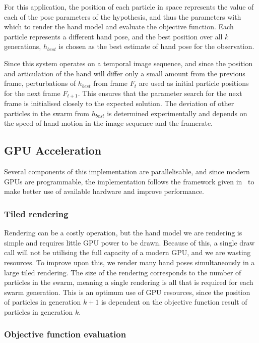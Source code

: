 \documentclass[10pt,a4paper,notitlepage,twocolumn]{report}
\begin{document}
For this application, the position of each particle in space represents the
value of each of the pose parameters of the hypothesis, and thus the parameters
with which to render the hand model and evaluate the objective function.  Each
particle represents a different hand pose, and the best position over all $k$
generations, $h_{best}$ is chosen as the best estimate of hand pose for the observation.

Since this system operates on a temporal image sequence, and since the position
and articulation of the hand will differ only a small amount from the previous frame,
perturbations of $h_{best}$ from frame $F_t$ are used as initial particle
positions for the next frame $F_{t+1}$.  This ensures that the parameter search
for the next frame is initialised closely to the expected solution.  The
deviation of other particles in the swarm from $h_{best}$ is determined
experimentally and depends on the speed of hand motion in the image sequence and
the framerate.

\subsection{GPU Acceleration}

Several components of this implementation are parallelisable, and since modern
GPUs are programmable, the implementation follows the framework given
in~\cite{kyriazis2011} to make better use of available hardware and improve
performance.

\subsubsection{Tiled rendering}

Rendering can be a costly operation, but the hand model we are rendering is
simple and requires little GPU power to be drawn.  Because of this, a single
draw call will not be utilising the full capacity of a modern GPU, and we are
wasting resources.  To improve upon this, we render many hand poses
simultaneously in a large tiled rendering.  The size of the rendering
corresponds to the number of particles in the swarm, meaning a single rendering 
is all that is required for each swarm generation.  This is an optimum use of
GPU resources, since the position of particles in generation $k+1$ is
dependent on the objective function result of particles in generation $k$.

\subsubsection{Objective function evaluation}
\end{document}
